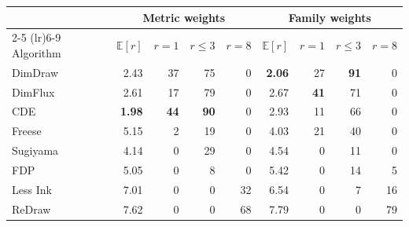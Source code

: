 \setlength{\tabcolsep}{3pt}
\begin{tabular*}{\columnwidth}{@{\extracolsep{\fill}}lrrrrrrrr@{}}
\toprule
 & \multicolumn{4}{c}{Metric weights} & \multicolumn{4}{c}{Family weights} \\
\cmidrule(lr){2-5} \cmidrule(lr){6-9}
Algorithm & $\mathbb{E}[r]$ & $r{=}1$ & $r{\le}3$ & $r{=}8$ & $\mathbb{E}[r]$ & $r{=}1$ & $r{\le}3$ & $r{=}8$ \\
\midrule
DimDraw & 2.43 & 37 & 75 & 0 & \textbf{2.06} & 27 & \textbf{91} & 0 \\
DimFlux & 2.61 & 17 & 79 & 0 & 2.67 & \textbf{41} & 71 & 0 \\
CDE & \textbf{1.98} & \textbf{44} & \textbf{90} & 0 & 2.93 & 11 & 66 & 0 \\
Freese & 5.15 & 2 & 19 & 0 & 4.03 & 21 & 40 & 0 \\
Sugiyama & 4.14 & 0 & 29 & 0 & 4.54 & 0 & 11 & 0 \\
FDP & 5.05 & 0 & 8 & 0 & 5.42 & 0 & 14 & 5 \\
Less Ink & 7.01 & 0 & 0 & 32 & 6.54 & 0 & 7 & 16 \\
ReDraw & 7.62 & 0 & 0 & 68 & 7.79 & 0 & 0 & 79 \\
\bottomrule
\end{tabular*}
